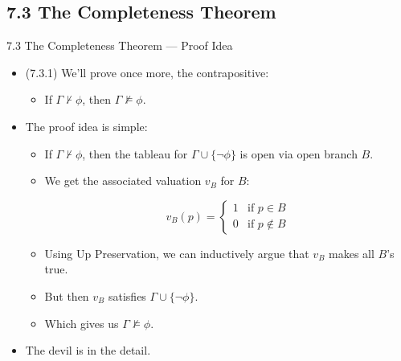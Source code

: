 \subsection{7.3 The Completeness Theorem}

\begin{frame}{7.3 The Completeness Theorem --- Proof Idea}


	\begin{itemize}
	
		\item (7.3.1) We'll prove once more, the contrapositive:
		
		\begin{itemize}
		
			\item If $\Gamma\nvdash\phi$, then $\Gamma\nvDash\phi$.
		
		\end{itemize}
		
		\item The proof idea is simple:
		
			\begin{itemize}
			
				\item If $\Gamma\nvdash\phi$, then the tableau for $\Gamma\cup\{\neg\phi\}$ is open via open branch $B$.
				
				\item We get the associated valuation $v_B$ for $B$:
				
				\[v_B(p)=\begin{cases} 1 &\text{if }p\in B\\0&\text{if }p\notin B\end{cases}\]
 
				
				\item Using Up Preservation, we can inductively argue that $v_B$ makes all $B$'s true.
				
				\item But then $v_B$ satisfies  $\Gamma\cup\{\neg\phi\}$.
				
				\item Which gives us $\Gamma\nvDash\phi$. 
			
			\end{itemize}
	
		\item The devil is in the detail.
	
	\end{itemize}	

\end{frame}

